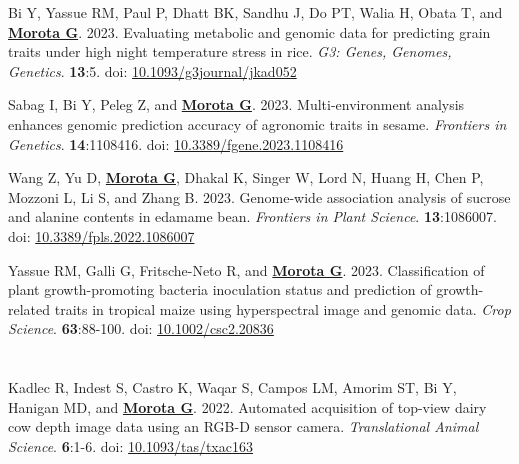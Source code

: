\documentclass[margin,line,10pt]{res}
\newenvironment{list1}{
  \begin{list}{\ding{113}}{%
      \setlength{\itemsep}{0in}
      \setlength{\parsep}{0in} \setlength{\parskip}{0in}
      \setlength{\topsep}{0in} \setlength{\partopsep}{0in} 
      \setlength{\leftmargin}{0.17in}}}{\end{list}}
\begin{document}
\begin{resume}
\begin{list1}
  \item [{\bf 65}.] Bi Y, Yassue RM, Paul P, Dhatt BK, Sandhu J, Do PT, Walia H, Obata T, and \textbf{\underline{Morota G}}. 2023. Evaluating metabolic and genomic data for predicting grain traits under high night temperature stress in rice. \emph{G3: Genes, Genomes, Genetics}. \textbf{13}:5. doi: \textcolor{blue}{\href{https://doi.org/10.1093/g3journal/jkad052}{10.1093/g3journal/jkad052}}  

  \vspace{0.5cm}

  \item [{\bf 64}.] Sabag I, Bi Y, Peleg Z, and \textbf{\underline{Morota G}}. 2023. Multi-environment analysis enhances genomic prediction accuracy of agronomic traits in sesame. \emph{Frontiers in Genetics}. \textbf{14}:1108416. doi: \textcolor{blue}{\href{https://doi.org/10.3389/fgene.2023.1108416}{10.3389/fgene.2023.1108416}}  

     \vspace{0.5cm}

  \item  [{\bf 63}.] Wang Z, Yu D, \textbf{\underline{Morota G}}, Dhakal K, Singer W, Lord N, Huang H, Chen P, Mozzoni L, Li S, and Zhang B. 2023. Genome-wide association analysis of sucrose and alanine contents in edamame bean. \emph{Frontiers in Plant Science}. \textbf{13}:1086007. doi: \textcolor{blue}{\href{10.3389/fpls.2022.1086007}{10.3389/fpls.2022.1086007}}  

  \vspace{0.5cm}

  \item [{\bf 62}.] Yassue RM, Galli G, Fritsche-Neto R, and \textbf{\underline{Morota G}}. 2023. Classification of plant growth-promoting bacteria inoculation status and prediction of growth-related traits in tropical maize using hyperspectral image and genomic data. \emph{Crop Science}. \textbf{63}:88-100. doi: \textcolor{blue}{\href{https://doi.org/10.1002/csc2.20836}{10.1002/csc2.20836}}  


\end{list1}


\section{}
\begin{list1}

  \item  [{\bf 61}.] Kadlec R, Indest S, Castro K, Waqar S, Campos LM, Amorim ST, Bi Y, Hanigan MD, and \textbf{\underline{Morota G}}. 2022. Automated acquisition of top-view dairy cow depth image data using an RGB-D sensor camera. \emph{Translational Animal Science}. \textbf{6}:1-6. doi: \textcolor{blue}{\href{https://doi.org/10.1093/tas/txac163}{10.1093/tas/txac163}}  


\end{list1}
\end{resume}
\end{document}
